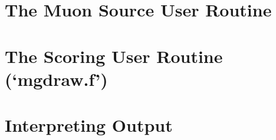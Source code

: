 \documentclass[10pt]{article}
\begin{document}









\part*{The Muon Source User Routine}



\part*{The Scoring User Routine (`mgdraw.f')}

\part*{Interpreting Output}

\clearpage
\appendixheaderon
\appendixpage
\begin{appendices}



\end{appendices}






\end{document}

